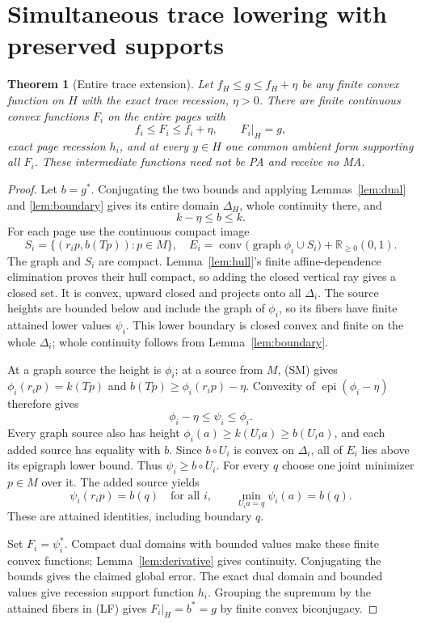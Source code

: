 \documentclass[11pt]{article}
\newtheorem{theorem}{Theorem}[section]
\newcommand{\R}{\mathbb R}
\newcommand{\epi}{\operatorname{epi}}
\newcommand{\conv}{\operatorname{conv}}
\begin{document}
\section{Simultaneous trace lowering with preserved supports}\label{sec:lowering}
\begin{theorem}[Entire trace extension]\label{thm:extension}
Let $f_H\leq g\leq f_H+\eta$ be any finite convex function on $H$ with the exact trace recession, $\eta>0$. There are finite continuous convex functions $F_i$ on the entire pages with
\[
 f_i\leq F_i\leq f_i+\eta,\qquad F_i|_H=g,
\]
exact page recession $h_i$, and at every $y\in H$ one common ambient form supporting all $F_i$. These intermediate functions need not be PA and receive no MA.
\end{theorem}
\begin{proof}
Let $b=g^*$. Conjugating the two bounds and applying Lemmas~\ref{lem:dual} and \ref{lem:boundary} gives its entire domain $\Delta_H$, whole continuity there, and
\[
 k-\eta\leq b\leq k.
\]
For each page use the continuous compact image
\[
 S_i=\{(r_ip,b(Tp)):p\in M\},\quad
 E_i=\conv\bigl(\operatorname{graph}\phi_i\cup S_i\bigr)+\R_{\geq0}(0,1).
\]
The graph and $S_i$ are compact. Lemma~\ref{lem:hull}'s finite affine-dependence elimination proves their hull compact, so adding the closed vertical ray gives a closed set. It is convex, upward closed and projects onto all $\Delta_i$. The source heights are bounded below and include the graph of $\phi_i$, so its fibers have finite attained lower values $\psi_i$. This lower boundary is closed convex and finite on the whole $\Delta_i$; whole continuity follows from Lemma~\ref{lem:boundary}.

At a graph source the height is $\phi_i$; at a source from $M$, (SM) gives $\phi_i(r_ip)=k(Tp)$ and $b(Tp)\geq\phi_i(r_ip)-\eta$. Convexity of $\epi(\phi_i-\eta)$ therefore gives
\[
 \phi_i-\eta\leq\psi_i\leq\phi_i.
\]
Every graph source also has height $\phi_i(a)\geq k(U_ia)\geq b(U_ia)$, and each added source has equality with $b$. Since $b\circ U_i$ is convex on $\Delta_i$, all of $E_i$ lies above its epigraph lower bound. Thus $\psi_i\geq b\circ U_i$. For every $q$ choose one joint minimizer $p\in M$ over it. The added source yields
\[
 \psi_i(r_ip)=b(q)\quad\text{for all }i,\qquad
 \min_{U_ia=q}\psi_i(a)=b(q).                                          \tag{LF}
\]
These are attained identities, including boundary $q$.

Set $F_i=\psi_i^*$. Compact dual domains with bounded values make these finite convex functions; Lemma~\ref{lem:derivative} gives continuity. Conjugating the bounds gives the claimed global error. The exact dual domain and bounded values give recession support function $h_i$. Grouping the supremum by the attained fibers in (LF) gives $F_i|_H=b^*=g$ by finite convex biconjugacy.


\end{proof}
\end{document}
